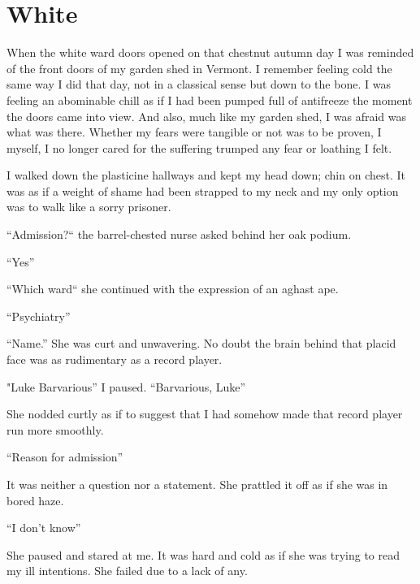 \chapter{White}

When the white ward doors opened on that chestnut autumn day I was
reminded of the front doors of my garden shed in Vermont. I
remember feeling cold the same way I did that day, not in a
classical sense but down to the bone. I was feeling an abominable
chill as if I had been pumped full of antifreeze the moment the
doors came into view. And also, much like my garden shed, I was
afraid was what was there. Whether my fears were tangible or not
was to be proven, I myself, I no longer cared for the suffering
trumped any fear or loathing I felt.



I walked down the plasticine hallways and kept my head down; chin
on chest. It was as if a weight of shame had been strapped to my
neck and my only option was to walk like a sorry prisoner.



``Admission?`` the barrel-chested nurse asked behind her oak
podium.



``Yes''



``Which ward`` she continued with the expression of an aghast
ape.



``Psychiatry''



``Name.'' She was curt and unwavering. No doubt the brain
behind that placid face was as rudimentary as a record
player.



"Luke Barvarious'' I paused. ``Barvarious,
Luke''



She nodded curtly as if to suggest that I had somehow made that
record player run more smoothly.



``Reason for admission''



It was neither a question nor a statement. She prattled it off as
if she was in bored haze.



``I don't know''



She paused and stared at me. It was hard and cold as if she was
trying to read my ill intentions. She failed due to a lack of
any.



